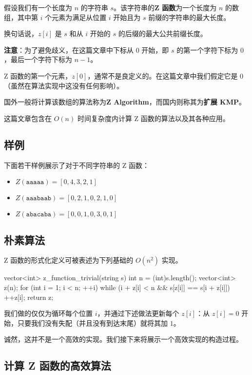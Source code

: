 
假设我们有一个长度为 $n$ 的字符串 $s$。该字符串的\textbf{Z 函数}为一个长度为 $n$ 的数组，其中第 $i$ 个元素为满足从位置 $i$ 开始且为 $s$ 前缀的字符串的最大长度。

换句话说，$z[i]$ 是 $s$ 和从 $i$ 开始的 $s$ 的后缀的最大公共前缀长度。

\textbf{注意}：为了避免歧义，在这篇文章中下标从 $0$ 开始，即 $s$ 的第一个字符下标为 $0$，最后一个字符下标为 $n - 1$。

Z 函数的第一个元素，$z[0]$，通常不是良定义的。在这篇文章中我们假定它是 $0$（虽然在算法实现中这没有任何影响）。

国外一般将计算该数组的算法称为\textbf{Z Algorithm}，而国内则称其为\textbf{扩展 KMP}。

这篇文章包含在 $O(n)$ 时间复杂度内计算 Z 函数的算法以及其各种应用。

\subsection{样例}

下面若干样例展示了对于不同字符串的 Z 函数：

\begin{itemize}
\item $Z(\mathtt{aaaaa}) = [0, 4, 3, 2, 1]$
\item $Z(\mathtt{aaabaab}) = [0, 2, 1, 0, 2, 1, 0]$
\item $Z(\mathtt{abacaba}) = [0, 0, 1, 0, 3, 0, 1]$
\end{itemize}

\subsection{朴素算法}

Z 函数的形式化定义可被表述为下列基础的 $O(n^2)$ 实现。

\begin{cppcode}
vector<int> z_function_trivial(string s) {
  int n = (int)s.length();
  vector<int> z(n);
  for (int i = 1; i < n; ++i)
    while (i + z[i] < n && s[z[i]] == s[i + z[i]]) ++z[i];
  return z;
}
\end{cppcode}

我们做的仅仅为循环每个位置 $i$，并通过下述做法更新每个 $z[i]$：从 $z[i] = 0$ 开始，只要我们没有失配（并且没有到达末尾）就将其加 $1$。

诚然，这并不是一个高效的实现。我们接下来将展示一个高效实现的构造过程。

\subsection{计算 Z 函数的高效算法}

